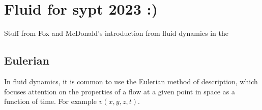 \chapter{Fluid for sypt 2023 :)}
Stuff from Fox and McDonald's introduction from fluid dynamics in the
\section{Eulerian}
In fluid dynamics, it is common to use the Eulerian method of description, which focuses attention on the properties of a flow at a given point in space as a function of time. For example $v(x,y,z,t)$.